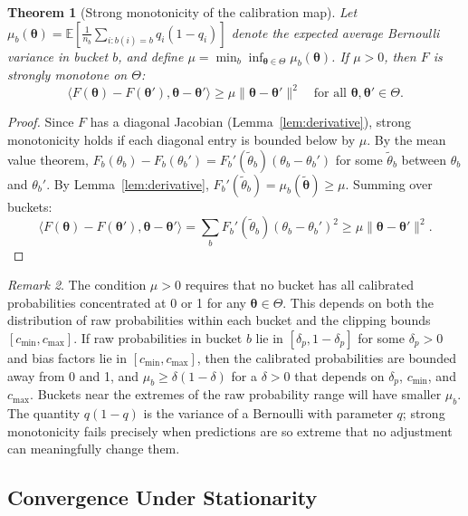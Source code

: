 \documentclass[12pt, letterpaper]{article}
\newtheorem{theorem}{Theorem}[section]
\theoremstyle{definition}
\theoremstyle{remark}
\newtheorem{remark}[theorem]{Remark}
\begin{document}
\begin{theorem}[Strong monotonicity of the calibration map]
\label{thm:monotone}
Let $\mu_b(\boldsymbol{\theta}) = \mathbb{E}\!\left[\frac{1}{n_b}\sum_{i:b(i)=b} q_i(1-q_i)\right]$ denote the expected average Bernoulli variance in bucket $b$, and define $\mu = \min_{b} \inf_{\boldsymbol{\theta} \in \Theta} \mu_b(\boldsymbol{\theta})$. If $\mu > 0$, then $F$ is strongly monotone on $\Theta$:
\[
\langle F(\boldsymbol{\theta}) - F(\boldsymbol{\theta}'), \boldsymbol{\theta} - \boldsymbol{\theta}' \rangle \ge \mu \|\boldsymbol{\theta} - \boldsymbol{\theta}'\|^2 \quad \text{for all } \boldsymbol{\theta}, \boldsymbol{\theta}' \in \Theta.
\]
\end{theorem}

\begin{proof}
Since $F$ has a diagonal Jacobian (Lemma~\ref{lem:derivative}), strong monotonicity holds if each diagonal entry is bounded below by $\mu$. By the mean value theorem, $F_b(\theta_b) - F_b(\theta_b') = F_b'(\tilde\theta_b)(\theta_b - \theta_b')$ for some $\tilde\theta_b$ between $\theta_b$ and $\theta_b'$. By Lemma~\ref{lem:derivative}, $F_b'(\tilde\theta_b) = \mu_b(\tilde{\boldsymbol{\theta}}) \ge \mu$. Summing over buckets:
\[
\langle F(\boldsymbol{\theta}) - F(\boldsymbol{\theta}'), \boldsymbol{\theta} - \boldsymbol{\theta}' \rangle = \sum_b F_b'(\tilde\theta_b)(\theta_b - \theta_b')^2 \ge \mu \|\boldsymbol{\theta} - \boldsymbol{\theta}'\|^2.
\]
\end{proof}

\begin{remark}
The condition $\mu > 0$ requires that no bucket has all calibrated probabilities concentrated at 0 or 1 for any $\boldsymbol{\theta} \in \Theta$. This depends on both the distribution of raw probabilities within each bucket and the clipping bounds $[c_{\min}, c_{\max}]$. If raw probabilities in bucket $b$ lie in $[\delta_p, 1-\delta_p]$ for some $\delta_p > 0$ and bias factors lie in $[c_{\min}, c_{\max}]$, then the calibrated probabilities are bounded away from 0 and 1, and $\mu_b \ge \delta(1-\delta)$ for a $\delta > 0$ that depends on $\delta_p$, $c_{\min}$, and $c_{\max}$. Buckets near the extremes of the raw probability range will have smaller $\mu_b$. The quantity $q(1-q)$ is the variance of a Bernoulli with parameter $q$; strong monotonicity fails precisely when predictions are so extreme that no adjustment can meaningfully change them.
\end{remark}

\subsection{Convergence Under Stationarity}
\end{document}
